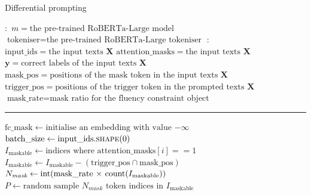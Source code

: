 \begin{algorithm}
\caption{Differential prompting}\label{alg:diff}
\begin{algorithmic}[1]
\small
\Require $\boldsymbol{:}$ \newline $m = \text{the pre-trained RoBERTa-Large model}$
\newline $\text{tokeniser} = \text{the pre-trained RoBERTa-Large tokeniser}$
\Ensure $\boldsymbol{:}$ \newline $\text{input\_ids} = \text{the input texts }\mathbf{X}$ \newline
    $\text{attention\_masks} = \text{the input texts }\mathbf{X}$ \newline
    $\mathbf{y} = \text{correct labels of the input texts }\mathbf{X}$ \newline
    $\text{mask\_pos} = \text{positions of the mask token in the input texts }\mathbf{X}$ \newline
    $\text{trigger\_pos} = \text{positions of the trigger token in the prompted texts }\mathbf{X}$
    \newline
    $\text{mask\_rate} = \text{mask ratio for the fluency constraint object}$
\vspace{0.3em}
\hrule
\vspace{0.3em}
\State $\text{fc\_mask} \gets \text{initialise an embedding with value $-\infty$}$
{\color{mylightgrey}}
\State $\text{batch\_size} \gets \text{input\_ids}.\Call{shape}{0}$
{\color{mylightgrey}}  
        \State $I_\text{maskable} \gets \text{indices where attention\_masks}[i] == 1$
        {\color{mylightgrey}}
        \State $I_\text{maskable} \gets I_\text{maskable} - (\text{trigger\_pos} \cap \text{mask\_pos})$
        {\color{mylightgrey}}
        \State $N_\textit{mask} \gets \text{int(\text{mask\_rate} $\times$ \text{count}($I_\text{maskable}$))}$
        {\color{mylightgrey}}
        \State $P \gets \text{random sample $N_\textit{mask}$ token indices in $I_\text{maskable}$}$
        {\color{mylightgrey}}

\end{algorithmic}
\end{algorithm}
